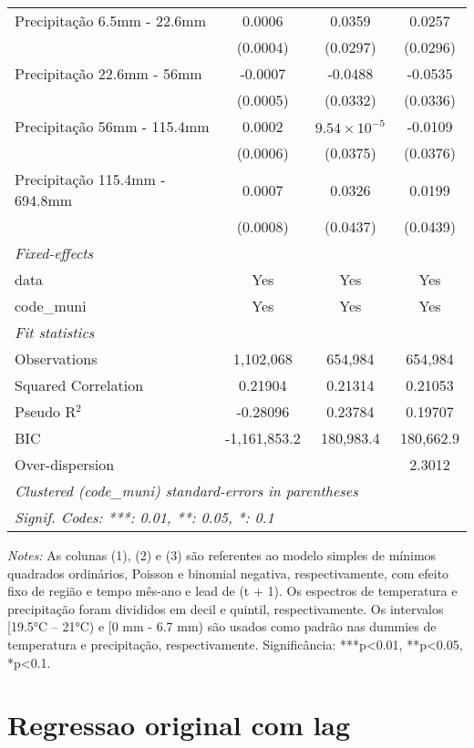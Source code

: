 \documentclass[
]{article}
\begin{document}
\begin{table}[htbp]
\begin{tabular}{lccc}
Precipitação 6.5mm - 22.6mm & 0.0006 & 0.0359 & 0.0257\\
  &(0.0004) & (0.0297) & (0.0296)\\
Precipitação 22.6mm - 56mm & -0.0007 & -0.0488 & -0.0535\\
  &(0.0005) & (0.0332) & (0.0336)\\
Precipitação 56mm - 115.4mm & 0.0002 & $9.54\times 10^{-5}$ & -0.0109\\
  &(0.0006) & (0.0375) & (0.0376)\\
Precipitação 115.4mm - 694.8mm & 0.0007 & 0.0326 & 0.0199\\
  &(0.0008) & (0.0437) & (0.0439)\\
\midrule \emph{Fixed-effects}&   &   &  \\
data & Yes & Yes & Yes\\
code\_muni & Yes & Yes & Yes\\
\midrule \emph{Fit statistics}&  & & \\
Observations & 1,102,068&654,984&654,984\\
Squared Correlation & 0.21904&0.21314&0.21053\\
Pseudo R$^2$ & -0.28096&0.23784&0.19707\\
BIC & -1,161,853.2&180,983.4&180,662.9\\
Over-dispersion & &&2.3012\\
\midrule\midrule\multicolumn{4}{l}{\emph{Clustered (code\_muni) standard-errors in parentheses}}\\
\multicolumn{4}{l}{\emph{Signif. Codes: ***: 0.01, **: 0.05, *: 0.1}}\\
\end{tabular}

\medskip \emph{Notes:} As colunas (1), (2) e (3) são referentes ao modelo simples de mínimos quadrados ordinários, Poisson e binomial negativa, respectivamente, com efeito fixo de região e tempo mês-ano e lead de (t + 1). Os espectros de temperatura e precipitação foram divididos em decil e quintil, respectivamente. Os intervalos [19.5°C – 21°C) e [0 mm - 6.7 mm) são usados como padrão nas dummies de temperatura e precipitação, respectivamente. Significância: ***p<0.01, **p<0.05, *p<0.1.
\end{table}

\hypertarget{regressao-original-com-lag}{%
\section{Regressao original com lag}\label{regressao-original-com-lag}}
\end{document}

